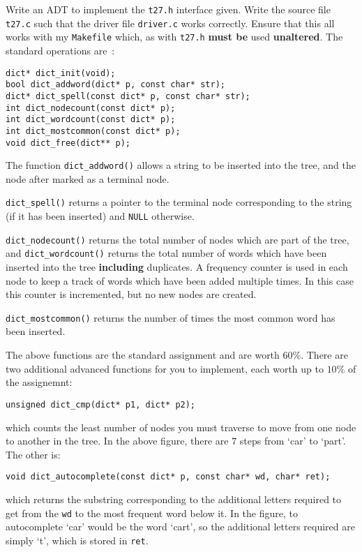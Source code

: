 \begin{exercise}
Write an ADT to implement the \verb^t27.h^ interface given.  Write the
source file \verb^t27.c^ such that the driver file \verb^driver.c^
works correctly.  Ensure that this all works with my \verb^Makefile^
which, as with \verb^t27.h^ {\bf must be} used {\bf unaltered}.
The standard operations are~:
\begin{verbatim}
dict* dict_init(void);
bool dict_addword(dict* p, const char* str);
dict* dict_spell(const dict* p, const char* str);
int dict_nodecount(const dict* p);
int dict_wordcount(const dict* p);
int dict_mostcommon(const dict* p);
void dict_free(dict** p);
\end{verbatim}

\noindent The function \verb^dict_addword()^ allows a string to be
inserted into the tree, and the node after marked as a terminal node.

\noindent \verb^dict_spell()^ returns a pointer to the terminal
node corresponding to the string (if it has been inserted) and \verb^NULL^
otherwise.

\noindent \verb^dict_nodecount()^ returns the total number of nodes
which are part of the tree, and \verb^dict_wordcount()^ returns the total
number of words which have been inserted into the tree {\bf including}
duplicates.  A frequency counter is used in each node to keep a track
of words which have been added multiple times. In this case this counter
is incremented, but no new nodes are created.

\noindent \verb^dict_mostcommon()^ returns the number of times the most
common word has been inserted.

\noindent The above functions are the standard assignment and are worth
$60\%$.  There are two additional advanced functions for you to implement, each
worth up to $10\%$ of the assignemnt:
\begin{verbatim}
unsigned dict_cmp(dict* p1, dict* p2);
\end{verbatim}
which counts the least number of nodes you must traverse to move from one node
to another in the tree. In the above figure, there are $7$ steps from `car'
to `part'. The other is:
\begin{verbatim}
void dict_autocomplete(const dict* p, const char* wd, char* ret);
\end{verbatim}
which returns the substring corresponding to the additional letters required to
get from the \verb^wd^ to the most frequent word below it. In the figure, to
autocomplete `car' would be the word `cart', so the additional letters required
are simply `t', which is stored in \verb^ret^.


\end{exercise}
